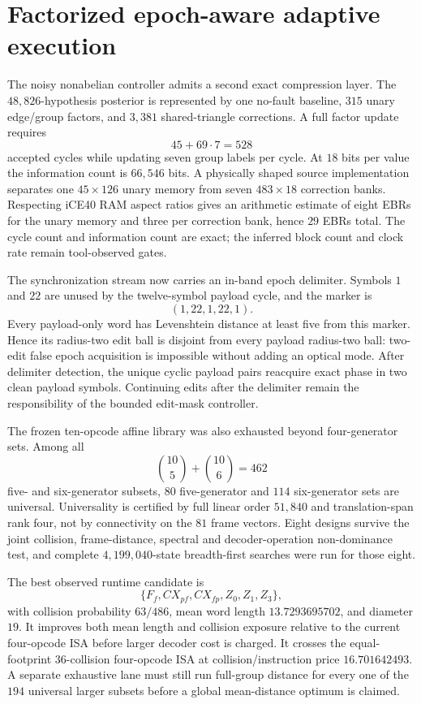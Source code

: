 \section{Factorized epoch-aware adaptive execution}
\label{sec:bt3153-bt3162}

The noisy nonabelian controller admits a second exact compression layer. The
$48{,}826$-hypothesis posterior is represented by one no-fault baseline, $315$ unary
edge/group factors, and $3{,}381$ shared-triangle corrections. A full factor update requires
\[
45+69\cdot7=528
\]
accepted cycles while updating seven group labels per cycle. At $18$ bits per value the
information count is $66{,}546$ bits. A physically shaped source implementation separates
one $45\times126$ unary memory from seven $483\times18$ correction banks. Respecting iCE40
RAM aspect ratios gives an arithmetic estimate of eight EBRs for the unary memory and three
per correction bank, hence $29$ EBRs total. The cycle count and information count are exact;
the inferred block count and clock rate remain tool-observed gates.

The synchronization stream now carries an in-band epoch delimiter. Symbols $1$ and $22$
are unused by the twelve-symbol payload cycle, and the marker is
\[
(1,22,1,22,1).
\]
Every payload-only word has Levenshtein distance at least five from this marker. Hence its
radius-two edit ball is disjoint from every payload radius-two ball: two-edit false epoch
acquisition is impossible without adding an optical mode. After delimiter detection, the
unique cyclic payload pairs reacquire exact phase in two clean payload symbols. Continuing
edits after the delimiter remain the responsibility of the bounded edit-mask controller.

The frozen ten-opcode affine library was also exhausted beyond four-generator sets. Among
all
\[
\binom{10}{5}+\binom{10}{6}=462
\]
five- and six-generator subsets, $80$ five-generator and $114$ six-generator sets are
universal. Universality is certified by full linear order $51{,}840$ and translation-span
rank four, not by connectivity on the $81$ frame vectors. Eight designs survive the joint
collision, frame-distance, spectral and decoder-operation non-dominance test, and complete
$4{,}199{,}040$-state breadth-first searches were run for those eight.

The best observed runtime candidate is
\[
\{F_f,CX_{pf},CX_{fp},Z_0,Z_1,Z_3\},
\]
with collision probability $63/486$, mean word length $13.7293695702$, and diameter $19$.
It improves both mean length and collision exposure relative to the current four-opcode
ISA before larger decoder cost is charged. It crosses the equal-footprint $36$-collision
four-opcode ISA at collision/instruction price $16.701642493$. A separate exhaustive lane
must still run full-group distance for every one of the $194$ universal larger subsets
before a global mean-distance optimum is claimed.

